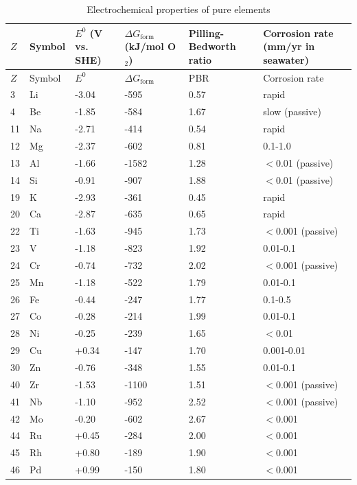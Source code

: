 \documentclass[12pt,a4paper]{article}
\begin{document}
	\begin{longtable}{p{0.8cm}p{1.2cm}p{2.5cm}p{2.5cm}p{2.5cm}p{2.5cm}}
		\caption{Electrochemical properties of pure elements} \label{tab:electrochemical-properties-func} \\
		\toprule
		\(Z\) & Symbol & \(E^0\) (V vs. SHE) & \(\Delta G_{\text{form}}\) (kJ/mol O\(_2\)) & Pilling-Bedworth ratio & Corrosion rate (mm/yr in seawater) \\
		\midrule
		\endfirsthead
		\toprule
		\(Z\) & Symbol & \(E^0\) & \(\Delta G_{\text{form}}\) & PBR & Corrosion rate \\
		\midrule
		\endhead
		3  & Li & -3.04 & -595 & 0.57 & rapid \\
		4  & Be & -1.85 & -584 & 1.67 & slow (passive) \\
		11 & Na & -2.71 & -414 & 0.54 & rapid \\
		12 & Mg & -2.37 & -602 & 0.81 & 0.1-1.0 \\
		13 & Al & -1.66 & -1582 & 1.28 & $<$0.01 (passive) \\
		14 & Si & -0.91 & -907 & 1.88 & $<$0.01 (passive) \\
		19 & K  & -2.93 & -361 & 0.45 & rapid \\
		20 & Ca & -2.87 & -635 & 0.65 & rapid \\
		22 & Ti & -1.63 & -945 & 1.73 & $<$0.001 (passive) \\
		23 & V  & -1.18 & -823 & 1.92 & 0.01-0.1 \\
		24 & Cr & -0.74 & -732 & 2.02 & $<$0.001 (passive) \\
		25 & Mn & -1.18 & -522 & 1.79 & 0.01-0.1 \\
		26 & Fe & -0.44 & -247 & 1.77 & 0.1-0.5 \\
		27 & Co & -0.28 & -214 & 1.99 & 0.01-0.1 \\
		28 & Ni & -0.25 & -239 & 1.65 & $<$0.01 \\
		29 & Cu & +0.34 & -147 & 1.70 & 0.001-0.01 \\
		30 & Zn & -0.76 & -348 & 1.55 & 0.01-0.1 \\
		40 & Zr & -1.53 & -1100 & 1.51 & $<$0.001 (passive) \\
		41 & Nb & -1.10 & -952 & 2.52 & $<$0.001 (passive) \\
		42 & Mo & -0.20 & -602 & 2.67 & $<$0.001 \\
		44 & Ru & +0.45 & -284 & 2.00 & $<$0.001 \\
		45 & Rh & +0.80 & -189 & 1.90 & $<$0.001 \\
		46 & Pd & +0.99 & -150 & 1.80 & $<$0.001 \\

\end{longtable}
\end{document}
